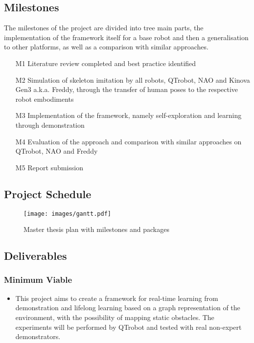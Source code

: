 \documentclass[thesis]{mas_proposal}
\begin{document}
	\subsection{Milestones}
		
		The milestones of the project are divided into tree main parts, the implementation of the framework itself for a base robot and then a generalisation to other platforms, as well as a comparison with similar approaches.
		
		\begin{enumerate}
		    \item[M1] Literature review completed and best practice identified
		  	\item[M2] Simulation of skeleton imitation by all robots, QTrobot, NAO and Kinova Gen3 a.k.a. Freddy, through the transfer of human poses to the respective robot embodiments
		    \item[M3] Implementation of the framework, namely self-exploration and learning through demonstration
		    \item[M4] Evaluation of the approach and comparison with similar approaches on QTrobot, NAO and Freddy
		    \item[M5] Report submission
		\end{enumerate}
	
	\subsection{Project Schedule}

	\begin{figure}[h!]
	    \texttt{[image: images/gantt.pdf]}
	    \caption{Master thesis plan with milestones and packages}
	    \label{fig:gantt}
	\end{figure}

	\subsection{Deliverables}
	
	\subsubsection*{Minimum Viable}
	\begin{itemize}
	    \item This project aims to create a framework for real-time learning from demonstration and lifelong learning based on a graph representation of the environment, with the possibility of mapping static obstacles. The experiments will be performed by QTrobot and tested with real non-expert demonstrators. 
	\end{itemize}
\end{document}
